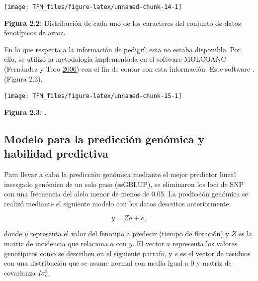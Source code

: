 \documentclass[11pt,spanish,a4paper,oneside,]{book} %
\begin{document}
\begin{center}\texttt{[image: TFM\_files/figure-latex/unnamed-chunk-14-1]} \end{center}

\begin{center}
\textbf{Figura 2.2:} Distribución de cada uno de los caracteres del conjunto de datos fenotípicos de arroz.

\end{center}

En lo que respecta a la información de pedigrí, esta no estaba disponible. Por ello, se utilizó la metodología implementada en el software MOLCOANC (Fernández y Toro \protect\hyperlink{ref-cite:24}{2006}) con el fin de contar con esta información. Este software . (Figura 2.3).

\begin{center}\texttt{[image: TFM\_files/figure-latex/unnamed-chunk-15-1]} \end{center}

\begin{center}
\textbf{Figura 2.3:} .

\end{center}

\hypertarget{modelo-para-la-predicciuxf3n-genuxf3mica-y-habilidad-predictiva}{%
\subsection{Modelo para la predicción genómica y habilidad predictiva}\label{modelo-para-la-predicciuxf3n-genuxf3mica-y-habilidad-predictiva}}

Para llevar a cabo la predicción genómica mediante el mejor predictor lineal insesgado genómico de un solo paso (ssGBLUP), se eliminaron los loci de SNP con una frecuencia del alelo menor de menos de 0.05. La predicción genómica se realizó mediante el siguiente modelo con los datos descritos anteriormente:

\begin{equation}
y = Za + e,
\end{equation}

donde \(y\) representa el valor del fenotipo a predecir (tiempo de floración) y \(Z\) es la matriz de incidencia que relaciona \(a\) con \(y\). El vector \(a\) representa los valores genotípicos como se describen en el siguiente parrafo, y \(e\) es el vector de residuos con una distribución que se asume normal con media igual a \(0\) y matriz de covarianza \(I\sigma^{2}_{e}\).
\end{document}
